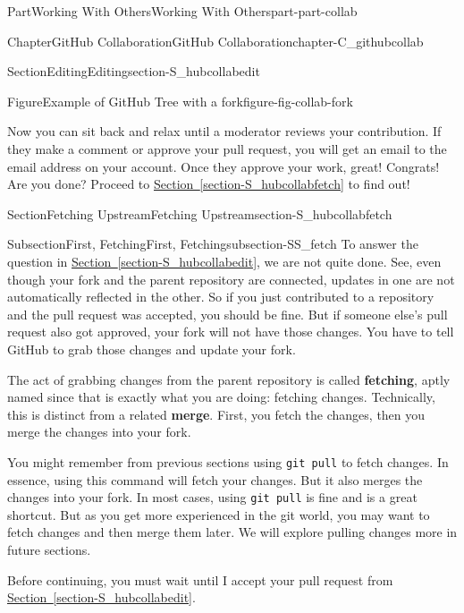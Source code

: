\documentclass[oneside,10pt,]{book}
\newcommand{\xreffont}{\relax}
\newcommand{\mono}[1]{\texttt{#1}}
\newcommand{\terminology}[1]{\textbf{#1}}
\begin{document}
\begin{partptx}{Part}{Working With Others}{}{Working With Others}{}{}{part-part-collab}
\begin{chapterptx}{Chapter}{GitHub Collaboration}{}{GitHub Collaboration}{}{}{chapter-C_githubcollab}
\begin{sectionptx}{Section}{Editing}{}{Editing}{}{}{section-S_hubcollabedit}
\begin{figureptx}{Figure}{Example of GitHub Tree with a fork}{figure-fig-collab-fork}{}
\begin{image}{0.025}{0.95}{0.025}{}
\end{image}%
\tcblower
\end{figureptx}%
Now you can sit back and relax until a moderator reviews your contribution. If they make a comment or approve your pull request, you will get an email to the email address on your account. Once they approve your work, great! Congrats! Are you done? Proceed to \hyperref[section-S_hubcollabfetch]{Section~{\xreffont\ref{section-S_hubcollabfetch}}} to find out!%
\end{sectionptx}
%
%
\typeout{************************************************}
\typeout{************************************************}
%
\begin{sectionptx}{Section}{Fetching Upstream}{}{Fetching Upstream}{}{}{section-S_hubcollabfetch}
%
%
\typeout{************************************************}
\typeout{************************************************}
%
\begin{subsectionptx}{Subsection}{First, Fetching}{}{First, Fetching}{}{}{subsection-SS_fetch}
%
%
To answer the question in \hyperref[section-S_hubcollabedit]{Section~{\xreffont\ref{section-S_hubcollabedit}}}, we are not quite done. See, even though your fork and the parent repository are connected, updates in one are not automatically reflected in the other. So if you just contributed to a repository and the pull request was accepted, you should be fine. But if someone else's pull request also got approved, your fork will not have those changes. You have to tell GitHub to grab those changes and update your fork.%
\par
The act of grabbing changes from the parent repository is called \terminology{fetching}, aptly named since that is exactly what you are doing: fetching changes. Technically, this is distinct from a related \terminology{merge}. First, you fetch the changes, then you merge the changes into your fork.%
\par
You might remember from previous sections using \mono{git pull} to fetch changes. In essence, using this command will fetch your changes. But it also merges the changes into your fork. In most cases, using \mono{git pull} is fine and is a great shortcut. But as you get more experienced in the git world, you may want to fetch changes and then merge them later. We will explore pulling changes more in future sections.%
\par
Before continuing, you must wait until I accept your pull request from \hyperref[section-S_hubcollabedit]{Section~{\xreffont\ref{section-S_hubcollabedit}}}.%

\end{subsectionptx}
\end{sectionptx}
\end{chapterptx}
\end{partptx}
\end{document}

